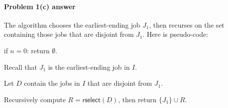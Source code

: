 
\paragraph{Problem 1(c) answer} 



\begin{blue}
  
  The algorithm chooses the earliest-ending job $J_1$,
  then recurses on the set containing those jobs that are disjoint from $J_1$.
  Here is pseudo-code:

  \begin{myframed}

    \begin{steps}

    \item[{\textsf{rselect}$(I=\{J_1, J_2, \ldots, J_n\})$:}]

      \step if $n = 0$: return $\emptyset$.  

      \step Recall that $J_1$ is the earliest-ending job in $I$.

      \step Let $D$ contain the jobs in $I$ that are disjoint from $J_1$.

      \step Recursively compute $R = \textsf{rselect}(D)$, then return $\{J_1\} \cup R$.

    \end{steps}

  \end{myframed}

\end{blue}

